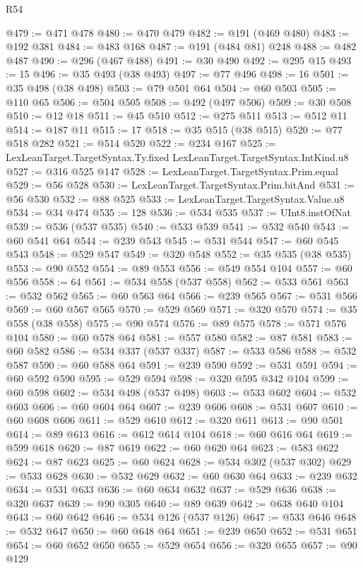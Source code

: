 \begin{lexlean}{R54}
\begin{coremodule}
@479 := @471 @478
@480 := @470 @479
@482 := @191 (@469 @480)
@483 := @192 @381
@484 := @483 @168
@487 := @191 (@484 @81) @248
@488 := @482 @487
@490 := @296 (@467 @488)
@491 := @30 @490
@492 := @295 @15
@493 := 15
@496 := @35 @493 (@38 @493)
@497 := @77 @496
@498 := 16
@501 := @35 @498 (@38 @498)
@503 := @79 @501 @64
@504 := @60 @503
@505 := @110 @65
@506 := @504 @505
@508 := @492 (@497 @506)
@509 := @30 @508
@510 := @12 @18
@511 := @45 @510
@512 := @275 @511
@513 := @512 @11
@514 := @187 @11
@515 := 17
@518 := @35 @515 (@38 @515)
@520 := @77 @518 @282
@521 := @514 @520
@522 := @234 @167
@525 := LexLeanTarget.TargetSyntax.Ty.fixed LexLeanTarget.TargetSyntax.IntKind.u8
@527 := @316 @525 @147
@528 := LexLeanTarget.TargetSyntax.Prim.equal
@529 := @56 @528
@530 := LexLeanTarget.TargetSyntax.Prim.bitAnd
@531 := @56 @530
@532 := @88 @525
@533 := LexLeanTarget.TargetSyntax.Value.u8
@534 := @34 @474
@535 := 128
@536 := @534 @535
@537 := UInt8.instOfNat
@539 := @536 (@537 @535)
@540 := @533 @539
@541 := @532 @540
@543 := @60 @541 @64
@544 := @239 @543
@545 := @531 @544
@547 := @60 @545 @543
@548 := @529 @547
@549 := @320 @548
@552 := @35 @535 (@38 @535)
@553 := @90 @552
@554 := @89 @553
@556 := @549 @554 @104
@557 := @60 @556
@558 := 64
@561 := @534 @558 (@537 @558)
@562 := @533 @561
@563 := @532 @562
@565 := @60 @563 @64
@566 := @239 @565
@567 := @531 @566
@569 := @60 @567 @565
@570 := @529 @569
@571 := @320 @570
@574 := @35 @558 (@38 @558)
@575 := @90 @574
@576 := @89 @575
@578 := @571 @576 @104
@580 := @60 @578 @64
@581 := @557 @580
@582 := @87 @581
@583 := @60 @582
@586 := @534 @337 (@537 @337)
@587 := @533 @586
@588 := @532 @587
@590 := @60 @588 @64
@591 := @239 @590
@592 := @531 @591
@594 := @60 @592 @590
@595 := @529 @594
@598 := @320 @595 @342 @104
@599 := @60 @598
@602 := @534 @498 (@537 @498)
@603 := @533 @602
@604 := @532 @603
@606 := @60 @604 @64
@607 := @239 @606
@608 := @531 @607
@610 := @60 @608 @606
@611 := @529 @610
@612 := @320 @611
@613 := @90 @501
@614 := @89 @613
@616 := @612 @614 @104
@618 := @60 @616 @64
@619 := @599 @618
@620 := @87 @619
@622 := @60 @620 @64
@623 := @583 @622
@624 := @87 @623
@625 := @60 @624
@628 := @534 @302 (@537 @302)
@629 := @533 @628
@630 := @532 @629
@632 := @60 @630 @64
@633 := @239 @632
@634 := @531 @633
@636 := @60 @634 @632
@637 := @529 @636
@638 := @320 @637
@639 := @90 @305
@640 := @89 @639
@642 := @638 @640 @104
@643 := @60 @642
@646 := @534 @126 (@537 @126)
@647 := @533 @646
@648 := @532 @647
@650 := @60 @648 @64
@651 := @239 @650
@652 := @531 @651
@654 := @60 @652 @650
@655 := @529 @654
@656 := @320 @655
@657 := @90 @129

\end{coremodule}
\end{lexlean}
